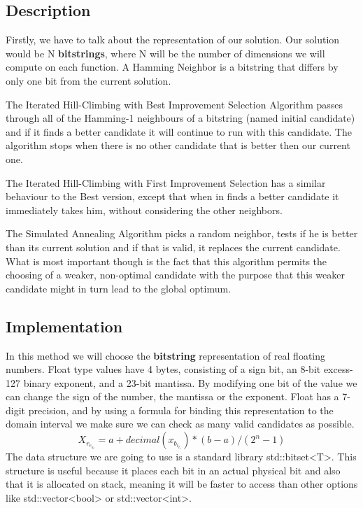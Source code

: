 \documentclass{article}
\begin{document}
\subsection{Description}
Firstly, we have to talk about the representation of our solution. 
Our solution would be N  \textbf{bitstrings}, where N will be the number of dimensions we will compute on each function.
A Hamming Neighbor is a bitstring that differs by only one bit from the current solution.

The Iterated Hill-Climbing with Best Improvement Selection Algorithm passes through all of the Hamming-1 neighbours of a bitstring (named initial candidate) and if it finds a better candidate it will continue to run with this candidate. The algorithm stops when there is no other candidate that is better then our current one.

The Iterated Hill-Climbing with First Improvement Selection has a similar behaviour to the Best version, except that when in finds a better candidate it immediately takes him, without considering the other neighbors.

The Simulated Annealing Algorithm picks a random neighbor, tests if he is better than its current solution and if that is valid, it replaces the current candidate. What is most important though is the fact that this algorithm permits the choosing of a weaker, non-optimal candidate with the purpose that this weaker candidate might in turn lead to the global optimum.

\subsection{Implementation}
In this method we will choose the \textbf{bitstring} representation of real floating numbers. Float type values have 4 bytes, consisting of a sign bit, an 8-bit excess-127 binary exponent, and a 23-bit mantissa. By modifying one bit of the value we can change the sign of the number, the mantissa or the exponent.
Float has a 7-digit precision, and by using a formula for binding this representation to the domain interval we make sure we can check as many valid candidates as possible.
$$ X_r_e_a_l = a+decimal(x_b_i_t_i)*(b-a)/(2^n-1)$$
The data structure we are going to use is a standard library std::bitset<T>. This structure is useful because it places each bit in an actual physical bit and also that it is allocated on stack, meaning it will be faster to access than other options like std::vector<bool> or std::vector<int>.
\end{document}

